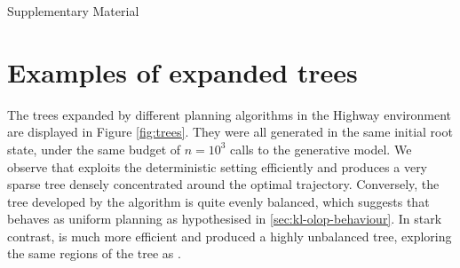 \documentclass[runningheads, envcountsame, a4paper]{llncs}
\begin{document}



\newpage
\appendix
\begin{center}
    \Large Supplementary Material
\end{center}

\section{Examples of expanded trees}

The trees expanded by different planning algorithms in the Highway environment are displayed in Figure \ref{fig:trees}. They were all generated in the same initial root state, under the same budget of $n=10^3$ calls to the generative model. We observe that \ODP exploits the deterministic setting efficiently and produces a very sparse tree densely concentrated around the optimal trajectory. Conversely, the tree developed by the \OLOP algorithm is quite evenly balanced, which suggests that \OLOP behaves as uniform planning as hypothesised in \ref{sec:kl-olop-behaviour}. In stark contrast, \KLOLOP is much more efficient and produced a highly unbalanced tree, exploring the same regions of the tree as \ODP. 
\end{document}
